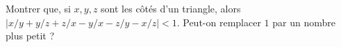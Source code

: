 Montrer que, si $x, y, z$ sont les côtés d'un triangle, alors $|x/y + y/z + z/x - y/x - z/y - x/z| < 1$. Peut-on remplacer $1$ par un nombre plus petit ?
